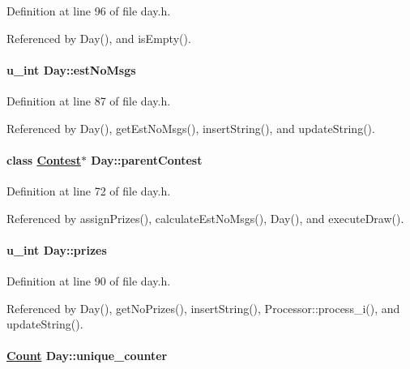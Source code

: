 Definition at line 96 of file day.h.

Referenced by Day(), and is\-Empty().\hypertarget{classDay_Dayo4}{
\paragraph[estNoMsgs]{\setlength{\rightskip}{0pt plus 5cm}u\_\-int Day::est\-No\-Msgs}\hfill}
\label{classDay_Dayo4}




Definition at line 87 of file day.h.

Referenced by Day(), get\-Est\-No\-Msgs(), insert\-String(), and update\-String().\hypertarget{classDay_Dayo0}{
\paragraph[parentContest]{\setlength{\rightskip}{0pt plus 5cm}class \hyperlink{classContest}{Contest}$\ast$ Day::parent\-Contest}\hfill}
\label{classDay_Dayo0}




Definition at line 72 of file day.h.

Referenced by assign\-Prizes(), calculate\-Est\-No\-Msgs(), Day(), and execute\-Draw().\hypertarget{classDay_Dayo5}{
\paragraph[prizes]{\setlength{\rightskip}{0pt plus 5cm}u\_\-int Day::prizes}\hfill}
\label{classDay_Dayo5}




Definition at line 90 of file day.h.

Referenced by Day(), get\-No\-Prizes(), insert\-String(), Processor::process\_\-i(), and update\-String().\hypertarget{classDay_Dayo3}{
\paragraph[unique\_\-counter]{\setlength{\rightskip}{0pt plus 5cm}\hyperlink{classCount}{Count} Day::unique\_\-counter}\hfill}
\label{classDay_Dayo3}




